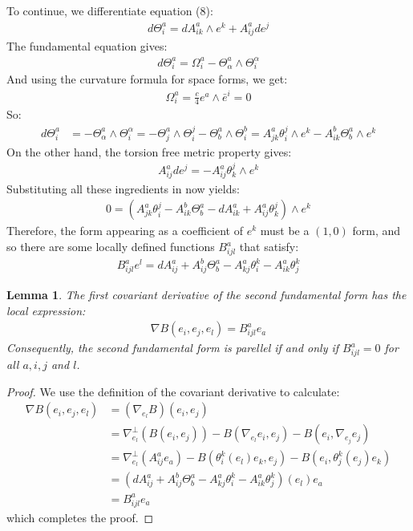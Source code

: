 \documentclass[11pt]{amsart}
\newtheorem{lem}[subsection]{Lemma}
\theoremstyle{definition}
\begin{document}
To continue, we differentiate equation (8):
%
\begin{align*}
d \Theta^a_i = d A^a_{ik} \wedge e^k + A^a_{ij} d e^j
\end{align*}
%
The fundamental equation gives:
%
\begin{align*}
d \Theta^a_i = \Omega^a_i - \Theta^a_{\alpha} \wedge \Theta^{\alpha}_i
\end{align*}
%
And using the curvature formula for space forms, we get:
%
\begin{align*}
\Omega^a_i = \frac{c}{4} e^a \wedge \bar{e}^i = 0
\end{align*}
%
So:
%
\begin{align*}
d \Theta^a_i &= - \Theta^a_{\alpha} \wedge \Theta^{\alpha}_i = - \Theta^a_j \wedge \Theta^j_i - \Theta^a_b \wedge \Theta^b_i = A^a_{jk} \theta^j_i \wedge e^k - A^b_{ik} \Theta^a_b \wedge e^k
\end{align*}
%
On the other hand, the torsion free metric property gives:
%
\begin{align*}
A^a_{ij} d e^j = - A^a_{ij} \theta^j_k \wedge e^k
\end{align*}
%
Substituting all these ingredients in now yields:
%
\begin{align*}
0 = \left( A^a_{jk} \theta^j_i - A^b_{ik} \Theta^a_b - d A^a_{ik} + A^a_{ij} \theta^j_k \right) \wedge e^k
\end{align*}
%
Therefore, the form appearing as a coefficient of $e^k$ must be a $(1,0)$ form, and so there are some locally defined functions $B^a_{ijl}$ that satisfy:
%
\begin{align}
B^a_{ijl} e^l = d A^a_{ij} + A^b_{ij} \Theta^a_b - A^a_{kj} \theta^k_i - A^a_{ik} \theta^k_j
\end{align}

\begin{lem}  The first covariant derivative of the second fundamental form has the local expression:
%
\begin{align*}
\nabla B (e_i, e_j, e_l) = B^a_{ijl} e_a
\end{align*}
%
Consequently, the second fundamental form is parellel if and only if $B^a_{ijl} = 0$ for all $a,i,j$ and $l$.
%
\end{lem}

\begin{proof}  We use the definition of the covariant derivative to calculate:
%
\begin{align*}
\nabla B (e_i, e_j, e_l) &= ( \nabla_{e_l} B )(e_i, e_j) \\
&= \nabla^{\perp}_{e_l} \left( B( e_i, e_j) \right) - B( \nabla_{e_l} e_i, e_j ) - B( e_i, \nabla_{e_j} e_j ) \\
&= \nabla^{\perp}_{e_l} \left( A^a_{ij} e_a \right) - B( \theta^k_i (e_l) e_k, e_j ) - B( e_i, \theta^k_j (e_j) e_k ) \\
&= \left( d A^a_{ij} + A^b_{ij} \Theta^a_b - A^a_{kj} \theta^k_i - A^a_{ik} \theta^k_j \right)(e_l) e_a \\
&= B^a_{ijl} e_a
\end{align*}
%
which completes the proof.
%
\end{proof}
\end{document}
